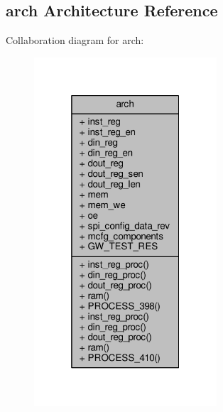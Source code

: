 \subsection{arch Architecture Reference}
\label{clasststcfg_1_1arch}


Collaboration diagram for arch\+:\nopagebreak
\begin{figure}[H]
\begin{center}
\leavevmode
\includegraphics[width=193pt]{d8/d0c/clasststcfg_1_1arch__coll__graph}
\end{center}
\end{figure}
